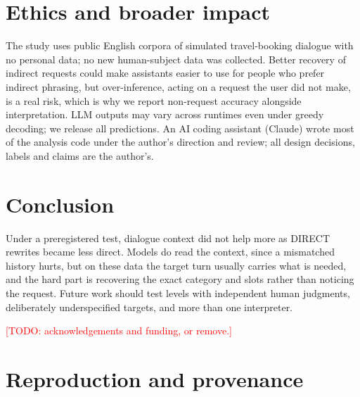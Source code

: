 \documentclass{article}
\newcommand{\todo}[1]{\textcolor{red}{[TODO: #1]}}
\begin{document}
\section{Ethics and broader impact}
\label{sec:ethics}

The study uses public English corpora of simulated travel-booking dialogue with no personal data;
no new human-subject data was collected. Better recovery of indirect requests could make
assistants easier to use for people who prefer indirect phrasing, but over-inference, acting on a
request the user did not make, is a real risk, which is why we report non-request accuracy
alongside interpretation. LLM outputs may vary across runtimes even under greedy decoding; we
release all predictions. An AI coding assistant (Claude) wrote most of the analysis code under the
author's direction and review; all design decisions, labels and claims are the author's.

\section{Conclusion}
\label{sec:conclusion}

Under a preregistered test, dialogue context did not help more as DIRECT rewrites became less
direct. Models do read the context, since a mismatched history hurts, but on these data the
target turn usually carries what is needed, and the hard part is recovering the exact category and
slots rather than noticing the request. Future work should test levels with independent human
judgments, deliberately underspecified targets, and more than one interpreter.

\begin{ack}
\todo{acknowledgements and funding, or remove.}
\end{ack}




\appendix

\section{Reproduction and provenance}
\label{app:repro}
\end{document}
